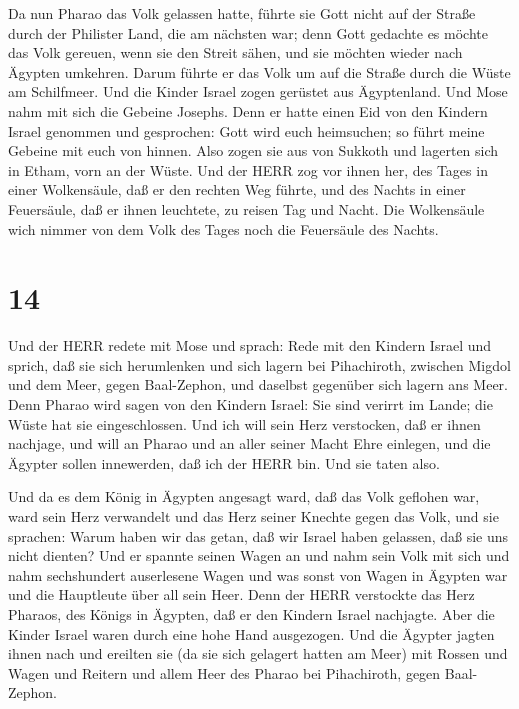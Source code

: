  Da nun Pharao das Volk gelassen hatte, führte sie Gott
nicht auf der Straße durch der Philister Land, die am nächsten war; denn
Gott gedachte es möchte das Volk gereuen, wenn sie den Streit sähen, und
sie möchten wieder nach Ägypten umkehren.  Darum führte er
das Volk um auf die Straße durch die Wüste am Schilfmeer. Und die Kinder
Israel zogen gerüstet aus Ägyptenland.  Und Mose nahm mit
sich die Gebeine Josephs. Denn er hatte einen Eid von den Kindern Israel
genommen und gesprochen: Gott wird euch heimsuchen; so führt meine
Gebeine mit euch von hinnen.  Also zogen sie aus von
Sukkoth und lagerten sich in Etham, vorn an der Wüste.  Und
der HERR zog vor ihnen her, des Tages in einer Wolkensäule, daß er den
rechten Weg führte, und des Nachts in einer Feuersäule, daß er ihnen
leuchtete, zu reisen Tag und Nacht.  Die Wolkensäule wich
nimmer von dem Volk des Tages noch die Feuersäule des Nachts.

\hypertarget{section-13}{%
\section{14}\label{section-13}}

 Und der HERR redete mit Mose und sprach:  Rede
mit den Kindern Israel und sprich, daß sie sich herumlenken und sich
lagern bei Pihachiroth, zwischen Migdol und dem Meer, gegen Baal-Zephon,
und daselbst gegenüber sich lagern ans Meer.  Denn Pharao
wird sagen von den Kindern Israel: Sie sind verirrt im Lande; die Wüste
hat sie eingeschlossen.  Und ich will sein Herz verstocken,
daß er ihnen nachjage, und will an Pharao und an aller seiner Macht Ehre
einlegen, und die Ägypter sollen innewerden, daß ich der HERR bin. Und
sie taten also.

 Und da es dem König in Ägypten angesagt ward, daß das Volk
geflohen war, ward sein Herz verwandelt und das Herz seiner Knechte
gegen das Volk, und sie sprachen: Warum haben wir das getan, daß wir
Israel haben gelassen, daß sie uns nicht dienten?  Und er
spannte seinen Wagen an und nahm sein Volk mit sich  und
nahm sechshundert auserlesene Wagen und was sonst von Wagen in Ägypten
war und die Hauptleute über all sein Heer.  Denn der HERR
verstockte das Herz Pharaos, des Königs in Ägypten, daß er den Kindern
Israel nachjagte. Aber die Kinder Israel waren durch eine hohe Hand
ausgezogen.  Und die Ägypter jagten ihnen nach und ereilten
sie (da sie sich gelagert hatten am Meer) mit Rossen und Wagen und
Reitern und allem Heer des Pharao bei Pihachiroth, gegen Baal-Zephon.

